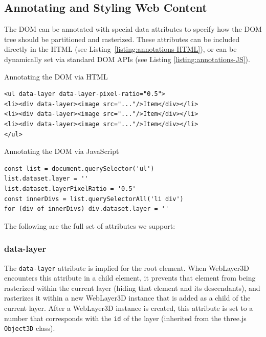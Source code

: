 \documentclass[sigconf]{acmart}
\begin{document}
\subsection{Annotating and Styling Web Content}
\label{sec:annotating}

The DOM can be annotated with special data attributes to specify how the DOM tree should be partitioned and rasterized. These attributes can be included directly in the HTML (see Listing~\ref{listing:annotations-HTML}), or can be dynamically set via standard DOM APIs (see Listing \ref{listing:annotations-JS}).

\begin{listing}[H]
\caption{Annotating the DOM via HTML}
\label{listing:annotations-HTML}
\begin{verbatim}
<ul data-layer data-layer-pixel-ratio="0.5">
<li><div data-layer><image src="..."/>Item</div></li>
<li><div data-layer><image src="..."/>Item</div></li>
<li><div data-layer><image src="..."/>Item</div></li>
</ul>
\end{verbatim}
\end{listing}

\vspace{-12px}

\begin{listing}[H]
\caption{Annotating the DOM via JavaScript}
\label{listing:annotations-JS}
\begin{verbatim}
const list = document.querySelector('ul')
list.dataset.layer = ''
list.dataset.layerPixelRatio = '0.5'
const innerDivs = list.querySelectorAll('li div')
for (div of innerDivs) div.dataset.layer = ''
\end{verbatim}
\end{listing}

The following are the full set of attributes we support: 

\subsubsection{data-layer}
The \verb|data-layer| attribute is implied for the root element. When WebLayer3D encounters this attribute in a child element, it prevents that element from being rasterized within the current layer (hiding that element and its descendants), and rasterizes it within a new WebLayer3D instance that is added as a child of the current layer. After a WebLayer3D instance is created, this attribute is set to a number that corresponds with the \verb|id| of the layer (inherited from the three.js \verb|Object3D| class). 
\end{document}
